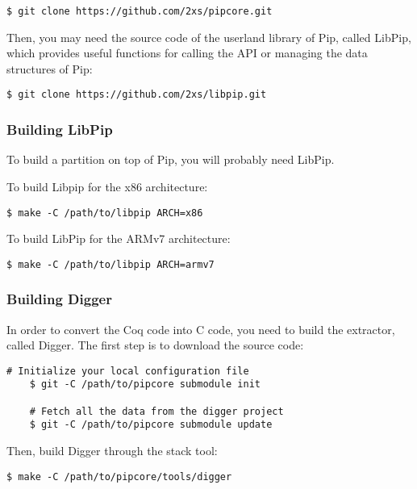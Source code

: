 \documentclass[10pt,a4paper,titlepage]{refart}
\begin{document}
\begin{lstlisting}[style=BashStyle]
    $ git clone https://github.com/2xs/pipcore.git
\end{lstlisting}

Then, you may need the source code of the userland library of Pip, called
LibPip, which provides useful functions for calling the API or managing the data
structures of Pip:

\begin{lstlisting}[style=BashStyle]
    $ git clone https://github.com/2xs/libpip.git
\end{lstlisting}

\subsubsection{Building LibPip}

To build a partition on top of Pip, you will probably need LibPip.

To build Libpip for the x86 architecture:

\begin{lstlisting}[style=BashStyle]
    $ make -C /path/to/libpip ARCH=x86
\end{lstlisting}

To build LibPip for the ARMv7 architecture:

\begin{lstlisting}[style=BashStyle]
    $ make -C /path/to/libpip ARCH=armv7
\end{lstlisting}

\subsubsection{Building Digger}

In order to convert the Coq code into C code, you need to build the extractor,
called Digger. The first step is to download the source code:

\begin{lstlisting}[style=BashStyle]
    # Initialize your local configuration file
    $ git -C /path/to/pipcore submodule init

    # Fetch all the data from the digger project
    $ git -C /path/to/pipcore submodule update
\end{lstlisting}

Then, build Digger through the stack tool:

\begin{lstlisting}[style=BashStyle]
    $ make -C /path/to/pipcore/tools/digger
\end{lstlisting}
\end{document}

